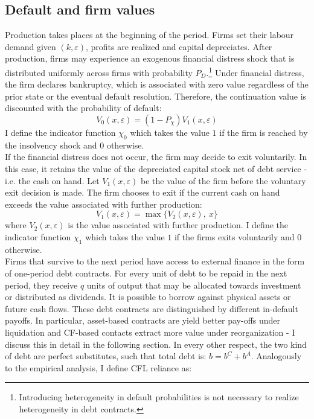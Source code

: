 \documentclass[12pt]{article}
\begin{document}
\subsection{Default and firm values \label{defaults}} 
Production takes places at the beginning of the period. Firms set their labour demand given $(k,\varepsilon)$, profits are realized and capital depreciates. After production, firms may experience an exogenous financial distress shock that is distributed uniformly across firms with probability $P_D$.\footnote{Introducing heterogeneity in default probabilities is not necessary to realize heterogeneity in debt contracts.} Under financial distress, the firm declares bankruptcy, which is associated with zero value regardless of the prior state or the eventual default resolution. Therefore, the continuation value is discounted with the probability of default: 
\begin{equation} \label{eq:V_0}
V_0(x,\varepsilon) = (1-P_\chi) V_1(x,\varepsilon)
\end{equation}
I define the indicator function $\chi_0$ which takes the value $1$ if the firm is reached by the insolvency shock and 0 otherwise. \vspace{3mm} \\
If the financial distress does not occur, the firm may decide to exit voluntarily. In this case, it retains the value of the depreciated capital stock net of debt service - i.e. the cash on hand. Let $V_1(x,\varepsilon)$ be the value of the firm before the voluntary exit decision is made. The firm chooses to exit if the current cash on hand exceeds the value associated with further production:
\begin{equation} \label{eq:V_1}
V_1(x,\varepsilon) = \max \Big\{ V_2(x,\varepsilon), \ x \Big\}
\end{equation} 
where $V_2(x,\varepsilon)$ is the value associated with further production. I define the indicator function $\chi_1$ which takes the value $1$ if the firms exits voluntarily and 0 otherwise. \vspace{3mm} \\
Firms that survive to the next period have access to external finance in the form of one-period debt contracts. For every unit of debt to be repaid in the next period, they receive $q$ units of output that may be allocated towards investment or distributed as dividends. It is possible to borrow against physical assets or future cash flows. These debt contracts are distinguished by different in-default payoffs. In particular, asset-based contracts are yield better pay-offs under liquidation and CF-based contacts extract more value under reorganization - I discuss this in detail in the following section. In every other respect, the two kind of debt are perfect substitutes, such that total debt is: $b = b^C+b^A$. Analogously to the empirical analysis, I define CFL reliance as: 
\end{document}
